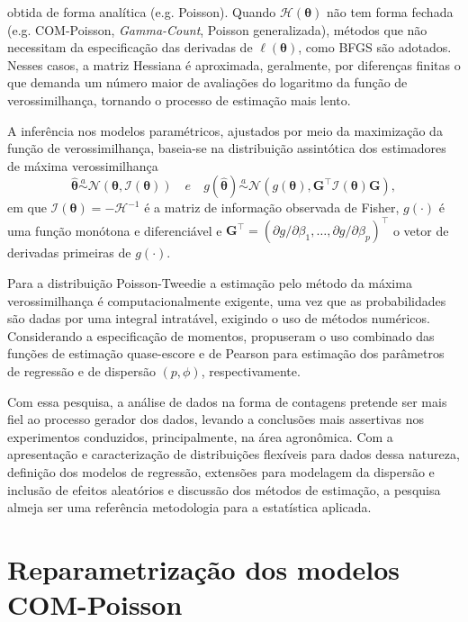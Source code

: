 \documentclass[
    oldfontcommands,
    11pt,
    openright,
    twoside,
    a4paper,
    english,
    brazil
]{abntex2}\usepackage[]{graphicx}\usepackage[]{color}
\begin{document}
obtida de forma analítica (e.g. Poisson). Quando
$\mathcal{H}(\bm{\theta})$ não tem forma fechada (e.g. COM-Poisson,
\textit{Gamma-Count}, Poisson generalizada), métodos que não necessitam
da especificação das derivadas de $\ell(\bm{\theta})$, como BFGS
\citep{Nocedal1995} são adotados. Nesses casos, a matriz Hessiana é
aproximada, geralmente, por diferenças finitas o que demanda um número
maior de avaliações do logaritmo da função de verossimilhança, tornando
o processo de estimação mais lento.

A inferência nos modelos paramétricos, ajustados por meio da maximização
da função de verossimilhança, baseia-se na distribuição assintótica dos
estimadores de máxima verossimilhança
$$
  \hat{\bm{\theta}} \overset{a}{\sim}
    \mathcal{N}(\bm{\theta}, \mathcal{I}(\bm{\theta}))
  \quad {e} \quad
  g(\hat{\bm{\theta}}) \overset{a}{\sim}
    \mathcal{N}(g(\bm{\theta}),
      \bm{G}^\top \mathcal{I}(\bm{\theta}) \bm{G}),
$$
em que $\mathcal{I}(\bm{\theta}) = -\mathcal{H}^{-1}$ é a matriz de
informação observada de Fisher, $g(\cdot)$ é uma função monótona e
diferenciável e
$\bm{G}^\top = (\partial g / \partial \beta_1, \ldots, \partial g
/ \partial \beta_p)^\top$ o vetor de derivadas primeiras de $g(\cdot)$.

Para a distribuição Poisson-Tweedie a estimação pelo método da máxima
verossimilhança é computacionalmente exigente, uma vez que as
probabilidades são dadas por uma integral intratável, exigindo o uso de
métodos numéricos. Considerando a especificação de momentos,
\citet{Bonat2018} propuseram o uso combinado das funções de estimação
quase-escore e de Pearson para estimação dos parâmetros de regressão e
de dispersão $(p, \phi)$, respectivamente.

Com essa pesquisa, a análise de dados na forma de contagens pretende ser
mais fiel ao processo gerador dos dados, levando a conclusões mais
assertivas nos experimentos conduzidos, principalmente, na área
agronômica. Com a apresentação e caracterização de distribuições
flexíveis para dados dessa natureza, definição dos modelos de regressão,
extensões para modelagem da dispersão e inclusão de efeitos aleatórios e
discussão dos métodos de estimação, a pesquisa almeja ser uma referência
metodologia para a estatística aplicada.

\chapter{Reparametrização dos modelos COM-Poisson}
\label{cha:reparcmp}
\end{document}
